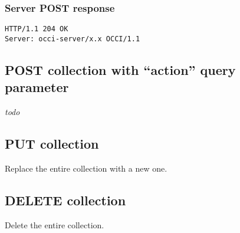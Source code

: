 \documentclass[10pt,a4paper]{article}
\begin{document}
\subsubsection{Server POST response}
\begin{verbatim}
HTTP/1.1 204 OK
Server: occi-server/x.x OCCI/1.1
\end{verbatim}

\subsection{POST collection with ``action'' query parameter}
{\em todo}

\subsection{PUT collection}
Replace the entire collection with a new one. 

\subsection{DELETE collection}
Delete the entire collection. 

\begin{comment}
\section{More examples}
The OCCI demo instance of occi-py%
\footnote{\tt http://github.com/nyren/occi-py}
running at {\tt http://www.nyren.net/api/} has an early version of the draft
JSON rendering available.  Feel free to play around with it. However, please
note the following limitations:
\begin{itemize}
\item The Content-Type is {\tt application/json} and not {\tt application/occi+json}
which would be more appropriate.
\item It does not support request data in JSON.
\item Filtering and pagination is not yet supported.
\end{itemize}

A few example queries using curl:
\begin{verbatim}
curl -i -H 'accept: application/json' http://www.nyren.net/api/-/
curl -i -H 'accept: application/json' http://www.nyren.net/api/link/
curl -i -X POST -H 'accept: application/json' http://www.nyren.net/api/compute/
\end{verbatim}
\end{comment}
\end{document}

